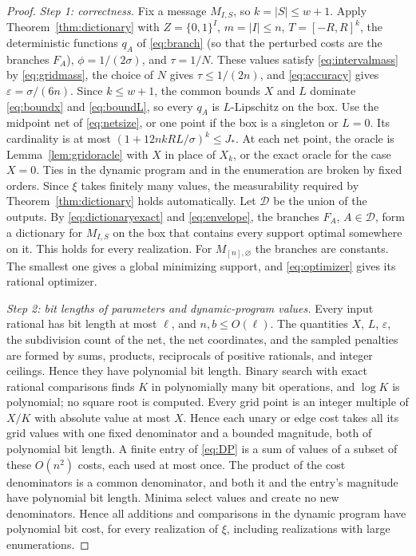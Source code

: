 \begin{proof}
\emph{Step 1: correctness.} Fix a message $M_{I,S}$, so $k=|S|\le w+1$.
Apply Theorem~\ref{thm:dictionary} with $Z=\{0,1\}^I$, $m=|I|\le n$,
$T=[-R,R]^k$, the deterministic functions $q_A$ of \eqref{eq:branch}
(so that the perturbed costs are the branches $F_A$),
$\phi=1/(2\sigma)$, and $\tau=1/N$. These values satisfy
\eqref{eq:intervalmass} by \eqref{eq:gridmass}, the choice of $N$ gives
$\tau\le1/(2n)$, and \eqref{eq:accuracy} gives $\varepsilon=\sigma/(6n)$.
Since $k\le w+1$, the common bounds $X$ and $L$ dominate
\eqref{eq:boundx} and \eqref{eq:boundL}, so every $q_A$ is $L$-Lipschitz
on the box. Use the midpoint net of \eqref{eq:netsize}, or one point if
the box is a singleton or $L=0$. Its cardinality is at most
$(1+12nkRL/\sigma)^k\le J_*$. At each net point, the oracle is
Lemma~\ref{lem:gridoracle} with $X$ in place of $X_k$, or the exact
oracle for the case $X=0$. Ties in the dynamic program and in the
enumeration are broken by fixed orders. Since $\xi$ takes finitely many
values, the measurability required by Theorem~\ref{thm:dictionary} holds
automatically. Let $\mathcal D$ be the union of the outputs. By
\eqref{eq:dictionaryexact} and \eqref{eq:envelope}, the branches $F_A$,
$A\in\mathcal D$, form a dictionary for $M_{I,S}$ on the box that contains
every support optimal somewhere on it. This holds for every realization.
For $M_{[n],\varnothing}$ the branches are constants. The smallest one
gives a global minimizing support, and \eqref{eq:optimizer} gives its
rational optimizer.

\emph{Step 2: bit lengths of parameters and dynamic-program values.}
Every input rational has bit length at most $\ell$, and $n,b\le O(\ell)$.
The quantities $X$, $L$, $\varepsilon$, the subdivision count of the net,
the net coordinates, and the sampled penalties are formed by sums,
products, reciprocals of positive rationals, and integer ceilings. Hence
they have polynomial bit length. Binary search with exact rational
comparisons finds $K$ in polynomially many bit operations, and $\log K$
is polynomial; no square root is computed. Every grid point is an
integer multiple of $X/K$ with absolute value at most $X$. Hence each
unary or edge cost takes all its grid values with one fixed denominator
and a bounded magnitude, both of polynomial bit length. A finite entry of
\eqref{eq:DP} is a sum of values of a subset of these $O(n^2)$ costs,
each used at most once. The product of the cost denominators is a common
denominator, and both it and the entry's magnitude have polynomial bit
length. Minima select values and create no new denominators. Hence all
additions and comparisons in the dynamic program have polynomial bit
cost, for every realization of $\xi$, including realizations with large
enumerations.


\end{proof}
